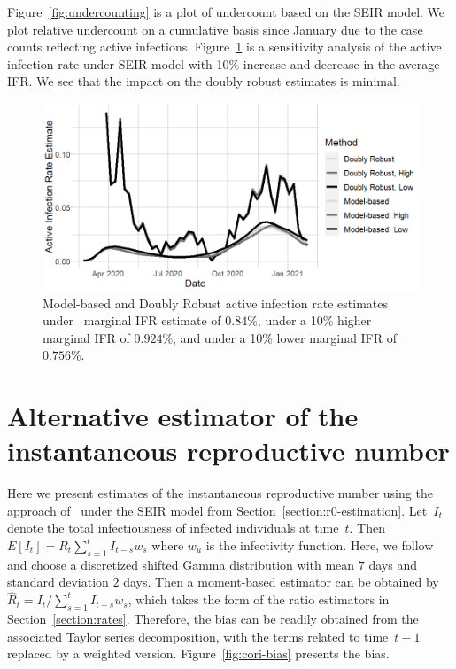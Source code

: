 \documentclass[12pt]{amsart}
\numberwithin{equation}{section}
\theoremstyle{plain}
\begin{document}
Figure~\ref{fig:undercounting} is a plot of undercount based on the SEIR model.  We plot relative undercount on a cumulative basis since January due to the case counts reflecting active infections. Figure~\ref{fig:tv_air_sens} is a sensitivity analysis of the active infection rate under SEIR model with 10\% increase and decrease in the average IFR.  We see that the impact on the doubly robust estimates is minimal.



\begin{figure}[!th]
 \centering
 \includegraphics[width=.6\linewidth]{../figs/tv_air_sensitivity.png}
 \caption{Model-based and Doubly Robust active infection rate estimates under~\cite{Ironse2103272118} marginal IFR estimate of $0.84$\%, under a 10\% higher marginal IFR of $0.924$\%, and under a 10\% lower marginal IFR of $0.756$\%.}
 \label{fig:tv_air_sens}
\end{figure}

\section{Alternative estimator of the instantaneous reproductive number}
\label{app:cori_rt}

Here we present estimates of the instantaneous reproductive number using the approach of~\cite{Cori20113} under the SEIR model from Section~\ref{section:r0-estimation}.  Let~$I_t$ denote the total infectiousness of infected individuals at time~$t$.  Then~$E[I_t] = R_t \sum_{s=1}^{t} I_{t-s} w_s$ where $w_{u}$ is the infectivity function.  Here, we follow~\cite{Cori20113} and choose a discretized shifted Gamma distribution with mean $7$ days and standard deviation $2$ days.  Then a moment-based estimator can be obtained by $\hat R_t = I_t / \sum_{s=1}^t I_{t-s} w_s$, which takes the form of the ratio estimators in Section~\ref{section:rates}.  Therefore, the bias can be readily obtained from the associated Taylor series decomposition, with the terms related to time~$t-1$ replaced by a weighted version.  Figure~\ref{fig:cori-bias} presents the bias.
\end{document}
